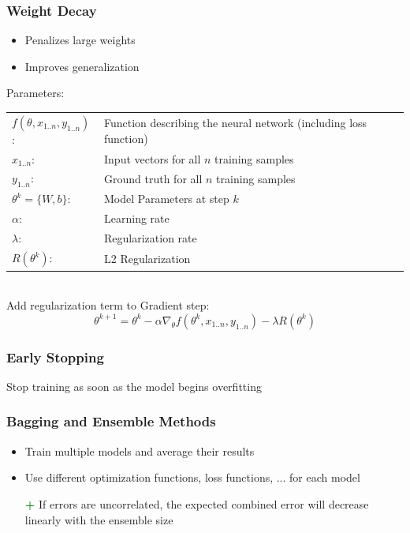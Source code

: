\documentclass[10pt,a4paper]{article}
\newcommand{\pros}{\textcolor{green}{\textbf{+}}}
\newcommand{\props}{$\circ$}
\newcommand{\iprops}{\item[\props]}
\begin{document}
\subsubsection{Weight Decay}
\begin{itemize}
	\iprops Penalizes large weights
	\iprops Improves generalization
\end{itemize}
Parameters: \\
\begin{tabular}{ll}
	$f(\theta, x_{1..n}, y_{1..n})$: & Function describing the neural network (including loss function) \\
	$x_{1..n}$: & Input vectors for all $n$ training samples \\
	$y_{1..n}$: & Ground truth for all $n$ training samples \\
	$\theta^k = \{W, b\}$: & Model Parameters at step $k$ \\
	$\alpha$: & Learning rate \\
	$\lambda$: & Regularization rate \\
	$R(\theta^k)$: & L2 Regularization
\end{tabular} ~\\

Add regularization term to Gradient step:
$$
	\theta^{k + 1} = \theta^k - \alpha \nabla_\theta f(\theta^k, x_{1..n}, y_{1..n}) - \lambda R(\theta^k)
$$

\subsubsection{Early Stopping}
Stop training as soon as the model begins overfitting

\subsubsection{Bagging and Ensemble Methods}
\begin{itemize}
	\item Train multiple models and average their results
	\item Use different optimization functions, loss functions, ... for each model
	\item[\pros] If errors are uncorrelated, the expected combined error will decrease linearly with the ensemble size
\end{itemize}
	
\end{document}
